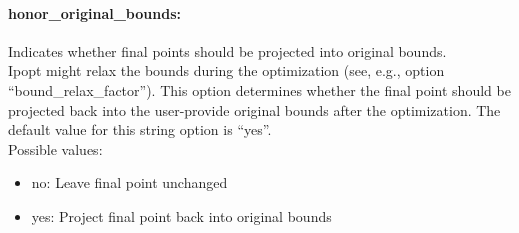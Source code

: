 \paragraph{honor\_original\_bounds:} Indicates whether final points should be projected into original bounds. $\;$ \\
 Ipopt might relax the bounds during the
optimization (see, e.g., option
``bound\_relax\_factor'').  This option determines
whether the final point should be projected back
into the user-provide original bounds after the
optimization.
The default value for this string option is ``yes''.
\\ 
Possible values:
\begin{itemize}
   \item no: Leave final point unchanged
   \item yes: Project final point back into original bounds
\end{itemize}


